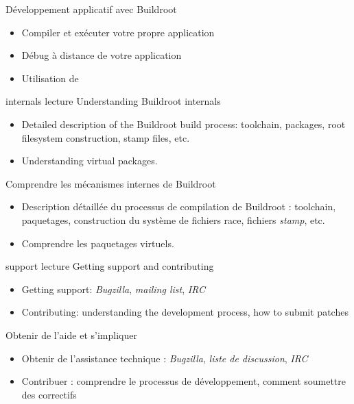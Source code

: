 {Développement applicatif avec Buildroot}
{
  \begin{itemize}
  \item Compiler et exécuter votre propre application
  \item Débug à distance de votre application
  \item Utilisation de 
  \end{itemize}
}
{internals}
{lecture}
{Understanding Buildroot internals}
{
  \begin{itemize}
  \item Detailed description of the Buildroot build process:
    toolchain, packages, root filesystem construction, stamp files,
    etc.
  \item Understanding virtual packages.
  \end{itemize}
}
{Comprendre les mécanismes internes de Buildroot}
{
  \begin{itemize}
  \item Description détaillée du processus de compilation de Buildroot :
    	toolchain, paquetages, construction du système de fichiers race,
	fichiers {\em stamp}, etc.
  \item Comprendre les paquetages virtuels.
  \end{itemize}
}
{support}
{lecture}
{Getting support and contributing}
{
  \begin{itemize}
  \item Getting support: {\em Bugzilla}, {\em mailing list}, {\em IRC}
  \item Contributing: understanding the development process, how to
    submit patches
  \end{itemize}
}
{Obtenir de l'aide et s'impliquer}
{
  \begin{itemize}
  \item Obtenir de l'assistance technique : {\em Bugzilla}, {\em liste de
	discussion}, {\em IRC}
  \item Contribuer : comprendre le processus de développement, comment
    soumettre des correctifs
  \end{itemize}
}

\def \feshowboards{
    \ifthenelse{\equal{\agendalanguage}{french}}{
      \section{Plateforme matérielle pour les travaux pratiques}
    }{
      \section{Hardware platform for practical labs}
    }

  \showboarditem{stm32mp1}
  \showboarditem{beagleboneblack}
  \newpage
}

